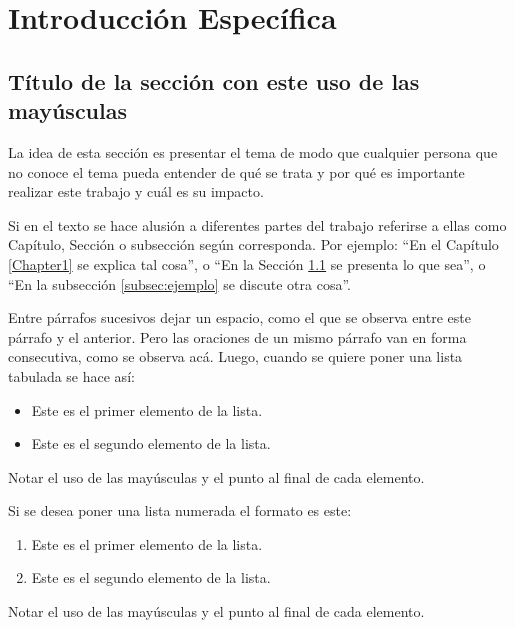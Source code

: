 \chapter{Introducción Específica} %

\label{Chapter2}


\section{Título de la sección con este uso de las mayúsculas}
\label{sec:ejemplo}
La idea de esta sección es presentar el tema de modo que cualquier persona que no conoce el tema pueda entender de qué se trata y por qué es importante realizar este trabajo y cuál es su impacto.

Si en el texto se hace alusión a diferentes partes del trabajo referirse a ellas como Capítulo, Sección o subsección según corresponda. Por ejemplo: ``En el Capítulo \ref{Chapter1} se explica tal cosa'', o ``En la Sección \ref{sec:ejemplo} se presenta lo que sea'', o ``En la subsección \ref{subsec:ejemplo} se discute otra cosa''.

Entre párrafos sucesivos dejar un espacio, como el que se observa entre este párrafo y el anterior. Pero las oraciones de un mismo párrafo van en forma consecutiva, como se observa acá. Luego, cuando se quiere poner una lista tabulada se hace así:

\begin{itemize}
	\item Este es el primer elemento de la lista.
	\item Este es el segundo elemento de la lista.
\end{itemize}

Notar el uso de las mayúsculas y el punto al final de cada elemento.

Si se desea poner una lista numerada el formato es este:

\begin{enumerate}
	\item Este es el primer elemento de la lista.
	\item Este es el segundo elemento de la lista.
\end{enumerate}

Notar el uso de las mayúsculas y el punto al final de cada elemento.

